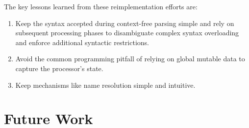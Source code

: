 The key lessons learned from these reimplementation efforts are:

\begin{enumerate}
\item Keep the syntax accepted during context-free parsing simple and rely on subsequent processing phases to disambiguate complex syntax overloading and enforce additional syntactic restrictions.
\item Avoid the common programming pitfall of relying on global mutable data to capture the processor's state.
\item Keep mechanisms like name resolution simple and intuitive.
\end{enumerate}

\section{Future Work}



%
